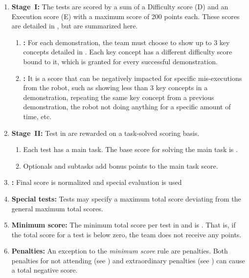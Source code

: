 \begin{enumerate}
	\item \textbf{Stage~I:} The tests are scored by a sum of a Difficulty score (D) and an Execution score (E) with a maximum score of 200 points each. These scores are detailed in , but are summarized here.
	\begin{enumerate}
		\item \textbf{:} For each demonstration, the team must choose to show up to 3 key concepts detailed in . Each key concept has a different difficulty score bound to it, which is granted for every successful demonstration.
		\item \textbf{:} It is a score that can be negatively impacted for specific mis-executions from the robot, such as showing less than 3 key concepts in a demonstration, repeating the same key concept from a previous demonstration, the robot not doing anything for a specific amount of time, etc.
	\end{enumerate}

	\item \textbf{Stage~II:} Test in  are rewarded on a task-solved scoring basis.
	\begin{enumerate}
		\item Each test has a main task. The base score for solving the main task is .
		\item Optionals and subtasks add bonus points to the main task score.
	\end{enumerate}

	\item \textbf{:} Final score is normalized and special evaluation is used

	\item \textbf{Special tests:} Tests may specify a maximum total score deviating from the general maximum total scores.

	\item \textbf{Minimum score:} The minimum total score per test in  and  is . That is, if the total score for a test is below zero, the team does not receive any points.

	\item \textbf{Penalties:} An exception to the \emph{minimum score} rule are penalties. Both penalties for not attending (see ) and extraordinary penalties (see ) can cause a total negative score. 


\end{enumerate}
